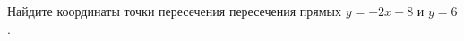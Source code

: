 \begin{ex}
	\begin{condition}
		Найдите координаты точки пересечения пересечения прямых \( y=-2x-8 \) и \( y=6 \).
	\end{condition}
\end{ex}